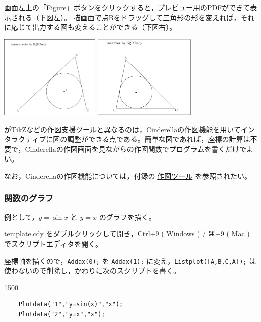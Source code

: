 \documentclass[papersize,a4paper,12pt,uplatex]{jsarticle}
\begin{document}
画面左上の「Figure」ボタンをクリックすると，プレビュー用のPDFができて表示される（下図左）。
描画面で点Bをドラッグして三角形の形を変えれば，それに応じて出力する図も変えることができる（下図右）。

\begin{center} \includegraphics[bb=0.00 0.00 396.02 331.02,height=4cm]{Fig/start10.pdf}  \includegraphics[bb=0.00 0.00 348.02 284.51,height=4cm]{Fig/incenter03.pdf} \end{center}

\vspace{\baselineskip}
\ketcindy がTikZなどの作図支援ツールと異なるのは，Cinderellaの作図機能を用いてインタラクティブに図の調整ができる点である。簡単な図であれば，座標の計算は不要で，Cinderellaの作図画面を見ながら\ketcindy の作図関数でプログラムを書くだけでよい。

なお，Cinderellaの作図機能については，付録の \hyperlink{geometrytool}{作図ツール} を参照されたい。

\subsubsection{関数のグラフ}

例として，$y=\sin x$ と $y=x$  のグラフを描く。

template.cdy をダブルクリックして開き，Ctrl+9 ( Windows ) /  ⌘+9 ( Mac ) でスクリプトエディタを開く。

座標軸を描くので，\verb|Addax(0);| を \verb|Addax(1);| に変え，\verb|Listplot([A,B,C,A]);| は使わないので削除し，かわりに次のスクリプトを書く。

\begin{layer}{150}{0}
\end{layer}
\begin{verbatim}
    Plotdata("1","y=sin(x)","x");
    Plotdata("2","y=x","x");
\end{verbatim}
\end{document}
